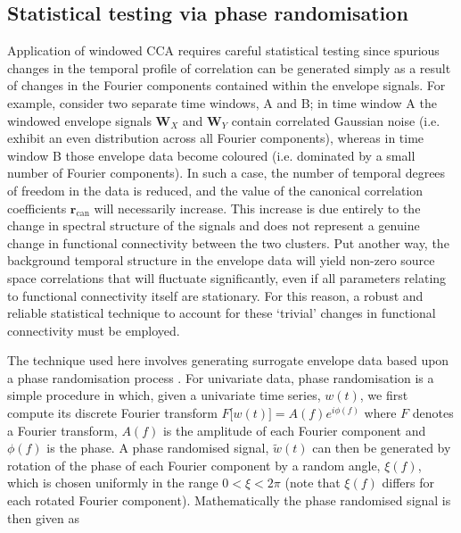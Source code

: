 \subsection{Statistical testing via phase randomisation}\label{phase_randomisation}
Application of windowed CCA requires careful statistical testing since spurious changes in the temporal profile of correlation can be generated simply as a result of changes in the Fourier components contained within the envelope signals. For example, consider two separate time windows, A and B; in time window A the windowed envelope signals $\mathbf{W}_{X}$ and $\mathbf{W}_{Y}$ contain correlated Gaussian noise (i.e. exhibit an even distribution across all Fourier components), whereas in time window B those envelope data become coloured (i.e. dominated by a small number of Fourier components). In such a case, the number of temporal degrees of freedom in the data is reduced, and the value of the canonical correlation coefficients $\mathbf{r}_\text{can}$ will necessarily increase. This increase is due entirely to the change in spectral structure of the signals and does not represent a genuine change in functional connectivity between the two clusters. Put another way, the background temporal structure in the envelope data will yield non-zero source space correlations that will fluctuate significantly, even if all parameters relating to functional connectivity itself are stationary. For this reason, a robust and reliable statistical technique to account for these ‘trivial’ changes in functional connectivity must be employed. 

The technique used here involves generating surrogate envelope data based upon a phase randomisation process \citep{Prichard1994}. For univariate data, phase randomisation is a simple procedure in which, given a univariate time series, $w(t)$, we first compute its discrete Fourier transform $F\big[w(t)\big]=A(f)e^{i\phi(f)}$ where $F$ denotes a Fourier transform, $A(f)$ is the amplitude of each Fourier component and $\phi(f)$ is the phase. A phase randomised signal, $\tilde{w}(t)$ can then be generated by rotation of the phase of each Fourier component by a random angle, $\xi(f)$, which is chosen uniformly in the range $0 < \xi < 2\pi$ (note that $\xi(f)$ differs for each rotated Fourier component). Mathematically the phase randomised signal is then given as 

